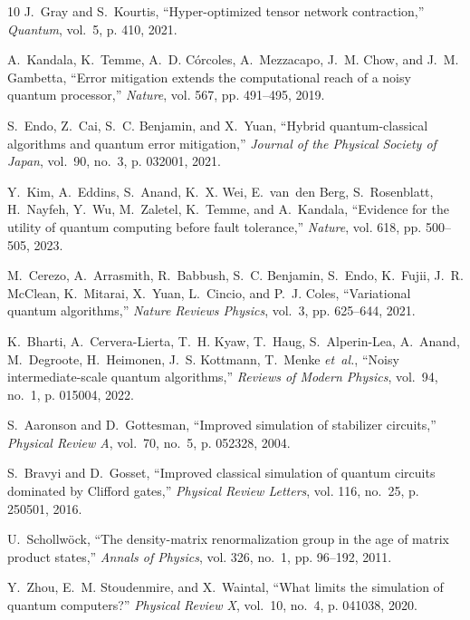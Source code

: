 \documentclass{ieeeaccess}
\begin{document}
\begin{thebibliography}{10}
J.~Gray and S.~Kourtis, ``Hyper-optimized tensor network contraction,''
  \emph{Quantum}, vol.~5, p. 410, 2021.

A.~Kandala, K.~Temme, A.~D. C{\'o}rcoles, A.~Mezzacapo, J.~M. Chow, and J.~M.
  Gambetta, ``Error mitigation extends the computational reach of a noisy
  quantum processor,'' \emph{Nature}, vol. 567, pp. 491--495, 2019.

S.~Endo, Z.~Cai, S.~C. Benjamin, and X.~Yuan, ``Hybrid quantum-classical
  algorithms and quantum error mitigation,'' \emph{Journal of the Physical
  Society of Japan}, vol.~90, no.~3, p. 032001, 2021.

Y.~Kim, A.~Eddins, S.~Anand, K.~X. Wei, E.~van~den Berg, S.~Rosenblatt,
  H.~Nayfeh, Y.~Wu, M.~Zaletel, K.~Temme, and A.~Kandala, ``Evidence for the
  utility of quantum computing before fault tolerance,'' \emph{Nature}, vol.
  618, pp. 500--505, 2023.

M.~Cerezo, A.~Arrasmith, R.~Babbush, S.~C. Benjamin, S.~Endo, K.~Fujii, J.~R.
  McClean, K.~Mitarai, X.~Yuan, L.~Cincio, and P.~J. Coles, ``Variational
  quantum algorithms,'' \emph{Nature Reviews Physics}, vol.~3, pp. 625--644,
  2021.

K.~Bharti, A.~Cervera-Lierta, T.~H. Kyaw, T.~Haug, S.~Alperin-Lea, A.~Anand,
  M.~Degroote, H.~Heimonen, J.~S. Kottmann, T.~Menke \emph{et~al.}, ``Noisy
  intermediate-scale quantum algorithms,'' \emph{Reviews of Modern Physics},
  vol.~94, no.~1, p. 015004, 2022.

S.~Aaronson and D.~Gottesman, ``Improved simulation of stabilizer circuits,''
  \emph{Physical Review A}, vol.~70, no.~5, p. 052328, 2004.

S.~Bravyi and D.~Gosset, ``Improved classical simulation of quantum circuits
  dominated by {Clifford} gates,'' \emph{Physical Review Letters}, vol. 116,
  no.~25, p. 250501, 2016.

U.~Schollw{\"o}ck, ``The density-matrix renormalization group in the age of
  matrix product states,'' \emph{Annals of Physics}, vol. 326, no.~1, pp.
  96--192, 2011.

Y.~Zhou, E.~M. Stoudenmire, and X.~Waintal, ``What limits the simulation of
  quantum computers?'' \emph{Physical Review X}, vol.~10, no.~4, p. 041038,
  2020.


\end{thebibliography}
\end{document}
